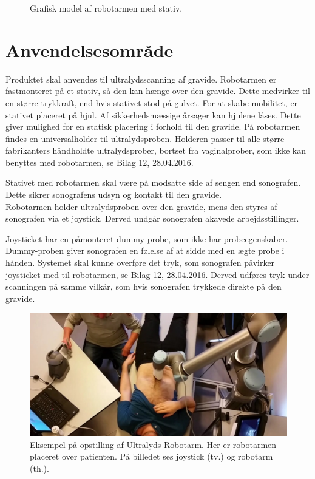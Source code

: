 \begin{figure}[H]
\begin{minipage}{0.55\textwidth}
		\caption{Grafisk model af robotarmen med stativ.}
		\label{Robotstativ}
	\end{minipage}
\end{figure}

\section{Anvendelsesområde}
Produktet skal anvendes til ultralydsscanning af gravide. Robotarmen er fastmonteret på et stativ, så den kan hænge over den gravide. Dette medvirker til en større trykkraft, end hvis stativet stod på gulvet. For at skabe mobilitet, er stativet placeret på hjul. Af sikkerhedsmæssige årsager kan hjulene låses. Dette giver mulighed for en statisk placering i forhold til den gravide. På robotarmen findes en universalholder til ultralydsproben. Holderen passer til alle større fabrikanters håndholdte ultralydsprober, bortset fra vaginalprober, som ikke kan benyttes med robotarmen, se Bilag 12, 28.04.2016.

Stativet med robotarmen skal være på modsatte side af sengen end sonografen. Dette sikrer sonografens udsyn og kontakt til den gravide. \\
Robotarmen holder ultralydsproben over den gravide, mens den styres af sonografen via et joystick. Derved undgår sonografen akavede arbejdsstillinger.

Joysticket har en påmonteret dummy-probe, som ikke har probeegenskaber. Dummy-proben giver sonografen en følelse af at sidde med en ægte probe i hånden.
Systemet skal kunne overføre det tryk, som sonografen påvirker joysticket med til robotarmen, se Bilag 12, 28.04.2016. Derved udføres tryk under scanningen på samme vilkår, som hvis sonografen trykkede direkte på den gravide.
 

\begin{figure}[H]\centering
	\includegraphics[width = 1.0\textwidth]{Figurer/ergonomiskLosning.jpg}
	\caption{Eksempel på opstilling af Ultralyds Robotarm. Her er robotarmen placeret over patienten. På billedet ses joystick (tv.) og robotarm (th.).  }
	\label{ergonomiskLosning}
\end{figure}

